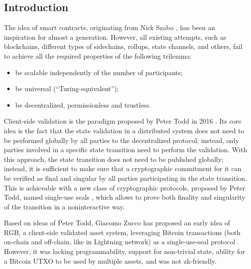 \documentclass[a4paper]{article}
\begin{document}
\begin{multicols}{2}

\section{Introduction}

The idea of smart contracts, originating from Nick Szabo \cite{Szabo},
has been an inspiration for almost a generation.
However, all existing attempts, such as blockchains, different types of sidechains,
rollups, state channels, and others, fail to achieve all the required properties
of the following trilemma:

\begin{itemize}
    \item be scalable independently of the number of participants;
    \item be universal (``Turing-equivalent'');
    \item be decentralized, permissionless and trustless.
\end{itemize}

Client-side validation is the paradigm proposed by Peter Todd in 2016 \cite{CSV}.
Its core idea is the fact that the state validation in a distributed system
does not need to be performed globally by all parties to the decentralized protocol;
instead, only parties involved in a specific state transition need to perform the validation.
With this approach, the state transition does not need to be published globally;
instead, it is sufficient to make sure that a cryptographic commitment for it
can be verified as final and singular by all parties participating in the state transition.
This is achievable with a new class of cryptographic protocols,
proposed by Peter Todd, named single-use seals \cite{SUS}, which allows
to prove both finality and singularity of the transition in a noninteractive way.

Based on ideas of Peter Todd, Giacomo Zucco has proposed an early idea of RGB,
a client-side validated asset system, leveraging Bitcoin transactions
(both on-chain and off-chain, like in Lightning network) as a single-use-seal protocol \cite{Zucco}.
However, it was lacking programmability, support for non-trivial state,
ability for a Bitcoin UTXO to be used by multiple assets,
and was not zk-friendly.


\end{multicols}
\end{document}
